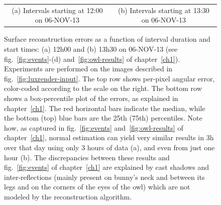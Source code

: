 \begin{figure}
\begin{tabular}{cc}
(a) Intervals starting at 12:00 on 06-NOV-13 & (b) Intervals starting at 13:30 on 06-NOV-13
\end{tabular}
\vspace{.5em}
\caption[Surface reconstruction errors as a function of capture interval duration]{\small Surface reconstruction errors as a function of interval duration and start times: (a) 12h00 and (b) 13h30 on 06-NOV-13 (see fig.~\ref{fig:events}-(d) and~\ref{fig:owl-results} of chapter~\ref{ch1}). Experiments are performed on the images described in fig.~\ref{fig:luxrender-input}. The top row shows per-pixel angular error, color-coded according to the scale on the right. The bottom row shows a box-percentile plot of the errors, as explained in chapter~\ref{ch1}. The red horizontal bars indicate the median, while the bottom (top) blue bars are the 25th (75th) percentiles. Note how, as captured in fig.~\ref{fig:events} and~\ref{fig:owl-results} of chapter~\ref{ch1}, normal estimation can yield very similar results in 3h over that day using only 3 hours of data (a), and even from just one hour (b). The discrepancies between these results and fig.~\ref{fig:events} of chapter~\ref{ch1} are explained by cast shadows and inter-reflections (mainly present on bunny's neck and between its legs and on the corners of the eyes of the owl) which are not modeled by the reconstruction algorithm.}
\label{fig:luxrender-results}
\end{figure}



% 


% 
% 

